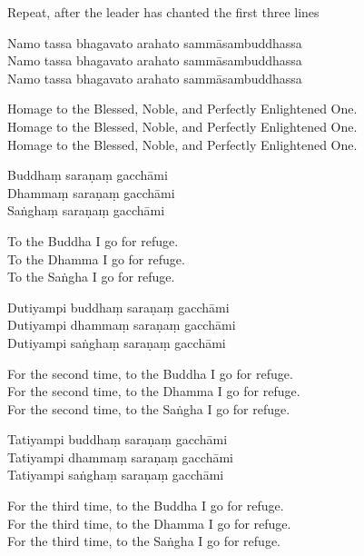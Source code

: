 \begin{instruction}
  Repeat, after the leader has chanted the first three lines
\end{instruction}

Namo tassa bhagavato arahato sammāsambuddhassa\\
Namo tassa bhagavato arahato sammāsambuddhassa\\
Namo tassa bhagavato arahato sammāsambuddhassa

\begin{english}
  Homage to the Blessed, Noble, and Perfectly Enlightened One.\\
  Homage to the Blessed, Noble, and Perfectly Enlightened One.\\
  Homage to the Blessed, Noble, and Perfectly Enlightened One.
\end{english}

Buddhaṃ saraṇaṃ gacchāmi\\
Dhammaṃ saraṇaṃ gacchāmi\\
Saṅghaṃ saraṇaṃ gacchāmi

\begin{english}
  To the Buddha I go for refuge.\\
  To the Dhamma I go for refuge.\\
  To the Saṅgha I go for refuge.
\end{english}

Dutiyampi buddhaṃ saraṇaṃ gacchāmi\\
Dutiyampi dhammaṃ saraṇaṃ gacchāmi\\
Dutiyampi saṅghaṃ saraṇaṃ gacchāmi

\begin{english}
  For the second time, to the Buddha I go for refuge.\\
  For the second time, to the Dhamma I go for refuge.\\
  For the second time, to the Saṅgha I go for refuge.
\end{english}

Tatiyampi buddhaṃ saraṇaṃ gacchāmi\\
Tatiyampi dhammaṃ saraṇaṃ gacchāmi\\
Tatiyampi saṅghaṃ saraṇaṃ gacchāmi

\clearpage

\begin{english}
  For the third time, to the Buddha I go for refuge.\\
  For the third time, to the Dhamma I go for refuge.\\
  For the third time, to the Saṅgha I go for refuge.
\end{english}

